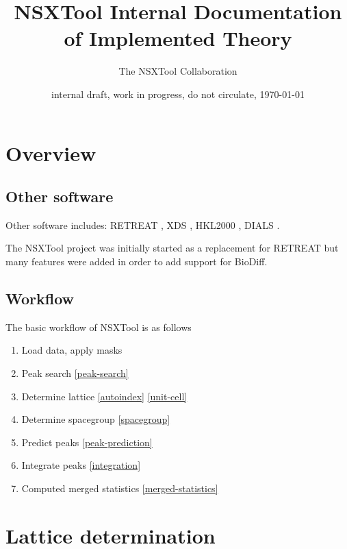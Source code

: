 \documentclass[11pt,a4paper]{article}
\begin{document}
\title{NSXTool Internal Documentation of Implemented Theory}
\author{The NSXTool Collaboration}

\date{internal draft, work in progress, do not circulate, \today}


\maketitle

\section{Overview}

\subsection{Other software}

Other software includes:
RETREAT \cite{StMc13},
XDS \cite{Kab10a},
HKL2000 \cite{OtMi97,OtMi06,Gew03},
DIALS \cite{WaWG16,WiWP18}.

The NSXTool project was initially started as a replacement for RETREAT but many features were added
in order to add support for BioDiff.

\subsection{Workflow}

The basic workflow of NSXTool is as follows
\begin{enumerate}
  \item Load data, apply masks
  \item Peak search \ref{peak-search}
  \item Determine lattice \ref{autoindex} \ref{unit-cell}
  \item Determine spacegroup \ref{spacegroup}
  \item Predict peaks \ref{peak-prediction}
  \item Integrate peaks \ref{integration}
  \item Computed merged statistics \ref{merged-statistics}
\end{enumerate}

\section{Lattice determination}
\end{document}
